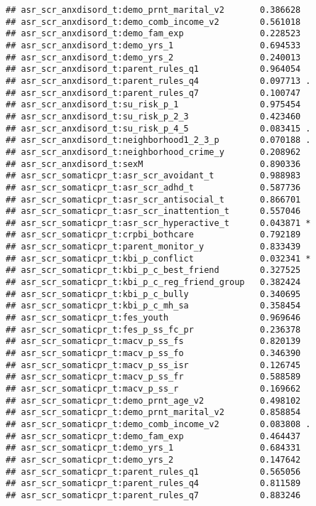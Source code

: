 \documentclass[
]{article}
\begin{document}
\begin{verbatim}
## asr_scr_anxdisord_t:demo_prnt_marital_v2       0.386628    
## asr_scr_anxdisord_t:demo_comb_income_v2        0.561018    
## asr_scr_anxdisord_t:demo_fam_exp               0.228523    
## asr_scr_anxdisord_t:demo_yrs_1                 0.694533    
## asr_scr_anxdisord_t:demo_yrs_2                 0.240013    
## asr_scr_anxdisord_t:parent_rules_q1            0.964054    
## asr_scr_anxdisord_t:parent_rules_q4            0.097713 .  
## asr_scr_anxdisord_t:parent_rules_q7            0.100747    
## asr_scr_anxdisord_t:su_risk_p_1                0.975454    
## asr_scr_anxdisord_t:su_risk_p_2_3              0.423460    
## asr_scr_anxdisord_t:su_risk_p_4_5              0.083415 .  
## asr_scr_anxdisord_t:neighborhood1_2_3_p        0.070188 .  
## asr_scr_anxdisord_t:neighborhood_crime_y       0.208962    
## asr_scr_anxdisord_t:sexM                       0.890336    
## asr_scr_somaticpr_t:asr_scr_avoidant_t         0.988983    
## asr_scr_somaticpr_t:asr_scr_adhd_t             0.587736    
## asr_scr_somaticpr_t:asr_scr_antisocial_t       0.866701    
## asr_scr_somaticpr_t:asr_scr_inattention_t      0.557046    
## asr_scr_somaticpr_t:asr_scr_hyperactive_t      0.043871 *  
## asr_scr_somaticpr_t:crpbi_bothcare             0.792189    
## asr_scr_somaticpr_t:parent_monitor_y           0.833439    
## asr_scr_somaticpr_t:kbi_p_conflict             0.032341 *  
## asr_scr_somaticpr_t:kbi_p_c_best_friend        0.327525    
## asr_scr_somaticpr_t:kbi_p_c_reg_friend_group   0.382424    
## asr_scr_somaticpr_t:kbi_p_c_bully              0.340695    
## asr_scr_somaticpr_t:kbi_p_c_mh_sa              0.358454    
## asr_scr_somaticpr_t:fes_youth                  0.969646    
## asr_scr_somaticpr_t:fes_p_ss_fc_pr             0.236378    
## asr_scr_somaticpr_t:macv_p_ss_fs               0.820139    
## asr_scr_somaticpr_t:macv_p_ss_fo               0.346390    
## asr_scr_somaticpr_t:macv_p_ss_isr              0.126745    
## asr_scr_somaticpr_t:macv_p_ss_fr               0.588589    
## asr_scr_somaticpr_t:macv_p_ss_r                0.169662    
## asr_scr_somaticpr_t:demo_prnt_age_v2           0.498102    
## asr_scr_somaticpr_t:demo_prnt_marital_v2       0.858854    
## asr_scr_somaticpr_t:demo_comb_income_v2        0.083808 .  
## asr_scr_somaticpr_t:demo_fam_exp               0.464437    
## asr_scr_somaticpr_t:demo_yrs_1                 0.684331    
## asr_scr_somaticpr_t:demo_yrs_2                 0.147642    
## asr_scr_somaticpr_t:parent_rules_q1            0.565056    
## asr_scr_somaticpr_t:parent_rules_q4            0.811589    
## asr_scr_somaticpr_t:parent_rules_q7            0.883246    

\end{verbatim}
\end{document}
